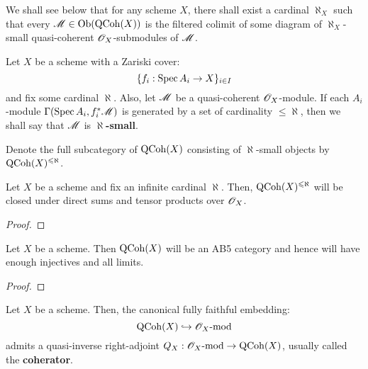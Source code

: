             We shall see below that for any scheme $X$, there shall exist a cardinal $\aleph_X$ such that every $\mathscr{M} \in \mathrm{Ob}( \mathrm{QCoh}(X) )$ is the filtered colimit of some diagram of $\aleph_X$-small quasi-coherent $\mathscr{O}_X$-submodules of $\mathscr{M}$. 
            \begin{definition} \label{def: small_quasi_coherent_modules}
                Let $X$ be a scheme with a Zariski cover:
                    $$\{f_i: \operatorname{Spec} A_i \to X\}_{i \in I}$$
                and fix some cardinal $\aleph$. Also, let $\mathscr{M}$ be a quasi-coherent $\mathscr{O}_X$-module. If each $A_i$-module $\Gamma(\operatorname{Spec} A_i, f_i^*\mathscr{M})$ is generated by a set of cardinality $\leq \aleph$, then we shall say that $\mathscr{M}$ is \textbf{$\aleph$-small}. 

                Denote the full subcategory of $\mathrm{QCoh}(X)$ consisting of $\aleph$-small objects by $\mathrm{QCoh}(X)^{\leqslant \aleph}$.
            \end{definition}
            \begin{lemma} \label{lemma: closure_properties_of_small_quasi_coherent_modules}
                Let $X$ be a scheme and fix an infinite cardinal $\aleph$. Then, $\mathrm{QCoh}(X)^{\leqslant \aleph}$ will be closed under direct sums and tensor products over $\mathscr{O}_X$.
            \end{lemma}
                \begin{proof}
                    
                \end{proof}
            \begin{theorem} \label{theorem: qcoh_homological_properties}
                Let $X$ be a scheme. Then $\mathrm{QCoh}(X)$ will be an AB5 category and hence will have enough injectives and all limits. 
            \end{theorem}
                \begin{proof}
                    
                \end{proof}
            \begin{corollary}
                Let $X$ be a scheme. Then, the canonical fully faithful embedding:
                    $$\mathrm{QCoh}(X) \hookrightarrow \mathscr{O}_X\text{-}\mathrm{mod}$$
                admits a quasi-inverse right-adjoint $Q_X: \mathscr{O}_X\text{-}\mathrm{mod} \to \mathrm{QCoh}(X)$, usually called the \textbf{coherator}.
            \end{corollary}
                

